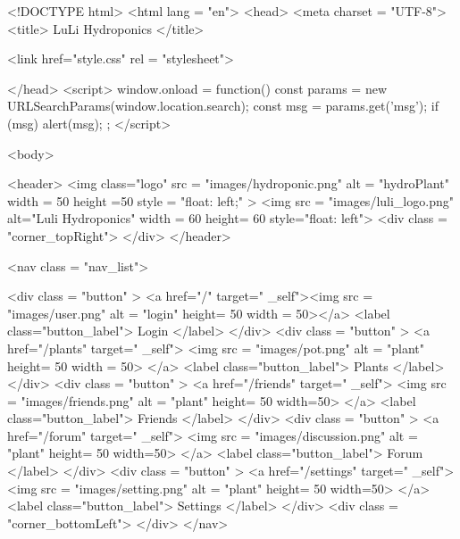\documentclass[12pt]{article} %
\begin{document}
\begin{htmlcode}[caption={Friends Page HTML}]
{{   <script src="scripts/settingsDownload.js"></script>

</body>
</html>

\end{htmlcode}




\pagebreak



\begin{htmlcode}[caption={Login Page HTML}]

<!DOCTYPE html>
<html lang = "en">
<head>
<meta charset = "UTF-8">
<title> LuLi Hydroponics </title>

<link href="style.css" 
      rel = "stylesheet">


</head>
<script>
   window.onload = function() {
       const params = new URLSearchParams(window.location.search);
       const msg = params.get('msg');
       if (msg) {
           alert(msg);
       }
   };
</script>

<body>
 
   <header>
      <img class="logo" src = "images/hydroponic.png" alt = "hydroPlant"  width = 50 height =50 style = "float: left;" >   
      <img src = "images/luli_logo.png" alt="Luli Hydroponics" width = 60 height= 60 style="float: left">
      <div class = "corner_topRight"> </div>
   </header>

     <nav class = "nav_list">
      
      <div class = "button" > 
         <a href="/" target=" _self"><img src = "images/user.png" alt = "login" height= 50 width = 50></a>
         <label class="button_label"> Login </label> 
      </div>
      <div class = "button" > 
         <a href="/plants" target=" _self"> <img src = "images/pot.png" alt = "plant" height= 50 width = 50> </a>
         <label class="button_label"> Plants </label> 
      </div>
      <div class = "button" > 
         <a href="/friends" target=" _self"> <img src = "images/friends.png" alt = "plant" height= 50 width=50> </a>
         <label class="button_label"> Friends </label> 
      </div>
      <div class = "button" > 
         <a href="/forum" target=" _self"> <img src = "images/discussion.png" alt = "plant" height= 50 width=50> </a>
         <label class="button_label"> Forum </label> 
      </div>
      <div class = "button" > 
         <a href="/settings" target=" _self"> <img src = "images/setting.png" alt = "plant" height= 50 width=50> </a>
         <label class="button_label"> Settings </label> 
      </div>
         <div class = "corner_bottomLeft"> </div>
     </nav>
     

\end{htmlcode}
\end{document}
